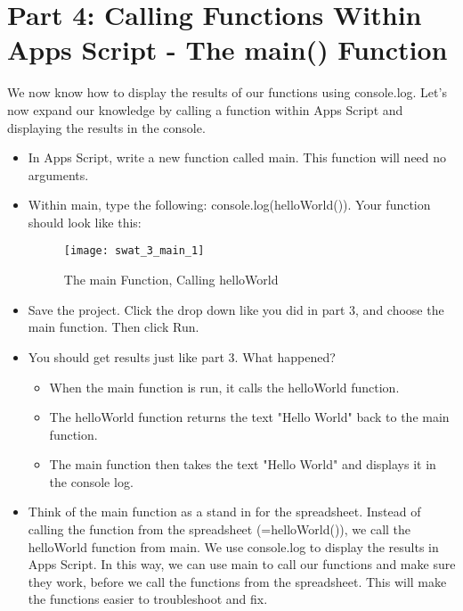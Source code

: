 \documentclass{article}
\begin{document}
\section*{Part 4: Calling Functions Within Apps Script - The main() Function}
We now know how to display the results of our functions using console.log.  Let's now expand our knowledge by calling a function within Apps Script and displaying the results in the console.
\begin{itemize}
    \item In Apps Script, write a new function called main.  This function will need no arguments.
    \item Within main, type the following:  console.log(helloWorld()).  Your function should look like this:
    \begin{figure}[H]
  		\centering
  		\texttt{[image: swat\_3\_main\_1]}
  		\caption{The main Function, Calling helloWorld}
	\end{figure}
	\item Save the project.  Click the drop down like you did in part 3, and choose the main function.  Then click Run.
	\item You should get results just like part 3.  What happened?
	\begin{itemize}
		\item When the main function is run, it calls the helloWorld function.
		\item The helloWorld function returns the text "Hello World" back to the main function.
		\item The main function then takes the text "Hello World" and displays it in the console log.
	\end{itemize}
	\item Think of the main function as a stand in for the spreadsheet.  Instead of calling the function from the spreadsheet (=helloWorld()), we call the helloWorld function from main.  We use console.log to display the results in Apps Script.  In this way, we can use main to call our functions and make sure they work, before we call the functions from the spreadsheet.  This will make the functions easier to troubleshoot and fix.
\end{itemize}
\end{document}
